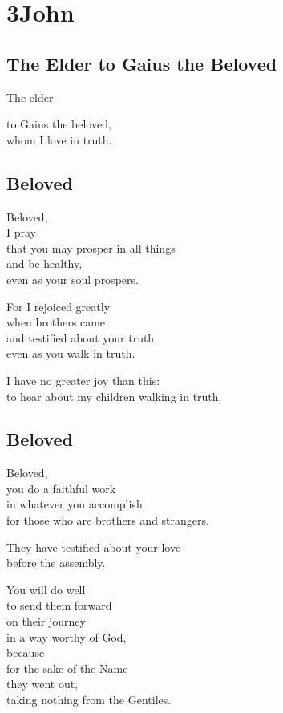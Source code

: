 \chapter{3John}

\newpage\section{The Elder to Gaius the Beloved}

The elder

to Gaius the beloved,
\\
\tab{}
whom I love in truth.

\newpage\section{Beloved}

Beloved,
\\
I pray
\\
\tab{}
that you may prosper in all things
\\
\tab{}
and be healthy,
\\
\tab{}
\tab{}
even as your soul prospers.

For I rejoiced greatly
\\
\tab{}
when brothers came
\\
\tab{}
and testified about your truth,
\\
\tab{}
\tab{}
even as you walk in truth.

I have no greater joy than this:
\\
\tab{}
to hear about my children walking in truth.

\newpage\section{Beloved}

Beloved,
\\
you do a faithful work
\\
\tab{}
in whatever you accomplish
\\
\tab{}
\tab{}
for those who are brothers and strangers.

They have testified about your love
\\
\tab{}
before the assembly.

You will do well
\\
\tab{}
to send them forward
\\
\tab{}
\tab{}
on their journey
\\
\tab{}
\tab{}
\tab{}
in a way worthy of God,
\\
because
\\
\tab{}
for the sake of the Name
\\
\tab{}
\tab{}
they went out,
\\
\tab{}
\tab{}
\tab{}
taking nothing from the Gentiles.

